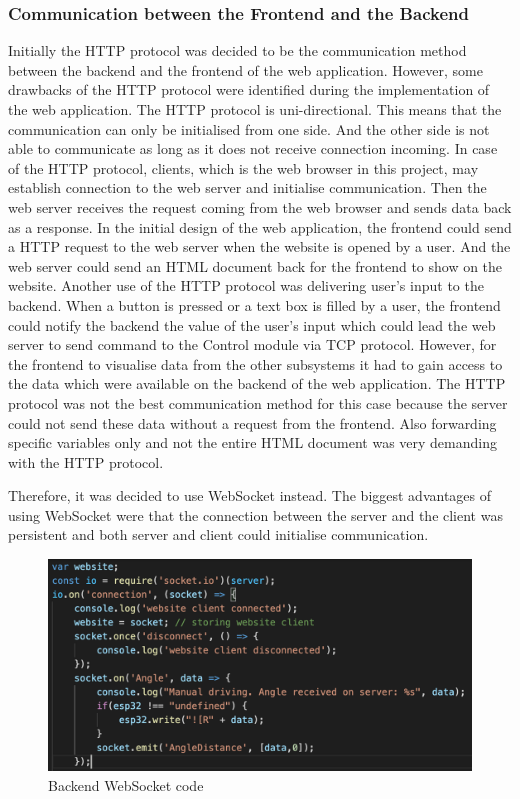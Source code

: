 \documentclass[a4paper]{article}
\begin{document}
\subsubsection{Communication between the Frontend and the Backend}

Initially the HTTP protocol was decided to be the communication method between the 
backend and the frontend of the web application. However, some drawbacks of the HTTP 
protocol were identified during the implementation of the web application. The HTTP 
protocol is uni-directional. \cite{HTTPOverview} This means that the communication can only 
be initialised from one side. And the other side is not able to communicate as long 
as it does not receive connection incoming. In case of the HTTP protocol, clients, 
which is the web browser in this project, may establish connection to the web server 
and initialise communication. Then the web server receives the request coming from the 
web browser and sends data back as a response. In the initial design of the web application, 
the frontend could send a HTTP request to the web server when the website is opened by a user. 
And the web server could send an HTML document back for the frontend to show on the website. 
Another use of the HTTP protocol was delivering user’s input to the backend. When a button 
is pressed or a text box is filled by a user, the frontend could notify the backend the 
value of the user’s input which could lead the web server to send command to the Control 
module via TCP protocol. However, for the frontend to visualise data from the other subsystems 
it had to gain access to the data which were available on the backend of the web application. 
The HTTP protocol was not the best communication method for this case because the server could 
not send these data without a request from the frontend. Also forwarding specific variables only 
and not the entire HTML document was very demanding with the HTTP protocol. 

Therefore, it was decided to use WebSocket instead. The biggest advantages of using WebSocket 
were that the connection between the server and the client was persistent and both server and 
client could initialise communication. 

\begin{figure}[H]
	\begin{Center}
		\includegraphics[width = 0.7\linewidth]{./images/WebSocket.png}
		\caption{Backend WebSocket code}
        \label{fig:websocketServer}
	\end{Center}
\end{figure}
\end{document}
